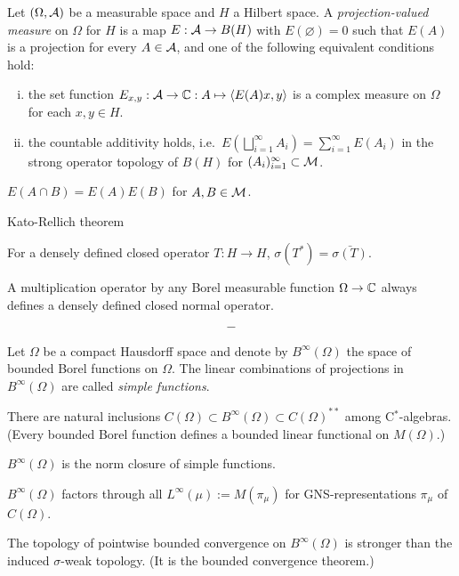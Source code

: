 \documentclass{../../large}
\begin{document}
\begin{prb}
Let $(\Omega,\mathcal{A})$ be a measurable space and $H$ a Hilbert space.
A \emph{projection-valued measure} on $\Omega$ for $H$ is a map $E:\mathcal{A}\to B(H)$ with $E(\varnothing)=0$ such that $E(A)$ is a projection for every $A\in\mathcal{A}$, and one of the following equivalent conditions hold:
\begin{enumerate}[(i)]
\item the set function $E_{x,y}:\mathcal{A}\to\mathbb{C}:A\mapsto\langle E(A)x,y\rangle$ is a complex measure on $\Omega$ for each $x,y\in H$.
\item the countable additivity holds, i.e.~$E(\bigsqcup_{i=1}^\infty A_i)=\sum_{i=1}^\infty E(A_i)$ in the strong operator topology of $B(H)$ for $(A_i)_{i=1}^\infty\subset\mathcal{M}$.
\end{enumerate}
\begin{parts}
\item $E(A\cap B)=E(A)E(B)$ for $A,B\in\mathcal{M}$.
\end{parts}
\end{prb}

Kato-Rellich theorem

For a densely defined closed operator $T:H\to H$, $\sigma(T^*)=\bar{\sigma(T)}$.

A multiplication operator by any Borel measurable function $\Omega\to\mathbb{C}$ always defines a densely defined closed normal operator.




\[-\]


\begin{prb}
Let $\Omega$ be a compact Hausdorff space and denote by $B^\infty(\Omega)$ the space of bounded Borel functions on $\Omega$.
The linear combinations of projections in $B^\infty(\Omega)$ are called \emph{simple functions}.
\begin{parts}
\item There are natural inclusions $C(\Omega)\subset B^\infty(\Omega)\subset C(\Omega)^{**}$ among C$^*$-algebras. (Every bounded Borel function defines a bounded linear functional on $M(\Omega)$.)
\item $B^\infty(\Omega)$ is the norm closure of simple functions.
\item $B^\infty(\Omega)$ factors through all $L^\infty(\mu):=M(\pi_\mu)$ for GNS-representations $\pi_\mu$ of $C(\Omega)$.
\item The topology of pointwise bounded convergence on $B^\infty(\Omega)$ is stronger than the induced $\sigma$-weak topology. (It is the bounded convergence theorem.)
\end{parts}
\end{prb}
\end{document}
